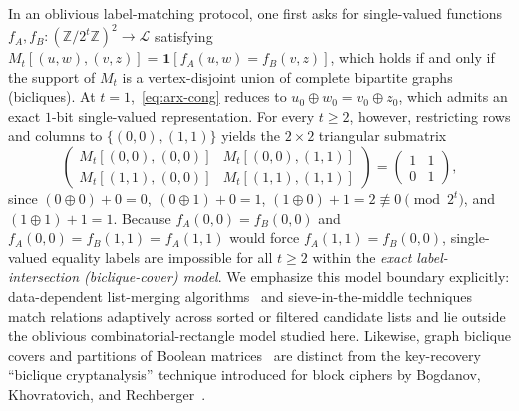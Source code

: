 \documentclass[11pt,reqno]{amsart}
\theoremstyle{definition}
\theoremstyle{remark}
\newcommand{\ZZ}{\mathbb{Z}}
\newcommand{\ind}{\mathbf{1}}
\numberwithin{equation}{section}
\begin{document}
In an oblivious label-matching protocol, one first asks for single-valued functions $f_A, f_B : (\ZZ/2^t\ZZ)^2 \to \mathcal{L}$ satisfying $M_t[(u,w),(v,z)] = \ind[f_A(u,w) = f_B(v,z)]$, which holds if and only if the support of $M_t$ is a vertex-disjoint union of complete bipartite graphs (bicliques). At $t = 1$,~\eqref{eq:arx-cong} reduces to $u_0 \oplus w_0 = v_0 \oplus z_0$, which admits an exact $1$-bit single-valued representation. For every $t \ge 2$, however, restricting rows and columns to $\{(0, 0), (1, 1)\}$ yields the $2 \times 2$ triangular submatrix
\begin{equation}
  \label{eq:obstruction-2x2}
  \begin{pmatrix} M_t[(0,0),(0,0)] & M_t[(0,0),(1,1)] \\ M_t[(1,1),(0,0)] & M_t[(1,1),(1,1)] \end{pmatrix}
  = \begin{pmatrix} 1 & 1 \\ 0 & 1 \end{pmatrix},
\end{equation}
since $(0 \oplus 0) + 0 = 0$, $(0 \oplus 1) + 0 = 1$, $(1 \oplus 0) + 1 = 2 \not\equiv 0 \pmod{2^t}$, and $(1 \oplus 1) + 1 = 1$. Because $f_A(0,0) = f_B(0,0)$ and $f_A(0,0) = f_B(1,1) = f_A(1,1)$ would force $f_A(1,1) = f_B(0,0)$, single-valued equality labels are impossible for all $t \ge 2$ within the \emph{exact label-intersection (biclique-cover) model}. We emphasize this model boundary explicitly: data-dependent list-merging algorithms~\cite{NP11} and sieve-in-the-middle techniques~\cite{CNPV13} match relations adaptively across sorted or filtered candidate lists and lie outside the oblivious combinatorial-rectangle model studied here. Likewise, graph biclique covers and partitions of Boolean matrices~\cite{Juk12,Pin14} are distinct from the key-recovery ``biclique cryptanalysis'' technique introduced for block ciphers by Bogdanov, Khovratovich, and Rechberger~\cite{BKR11}.
\end{document}

